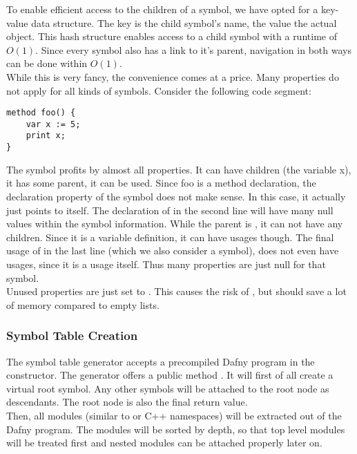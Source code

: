 To enable efficient access to the children of a symbol, we have opted for a key-value data structure.
The key is the child symbol's name, the value the actual  object.
This hash structure enables access to a child symbol with a runtime of $O(1)$.
Since every symbol also has a link to it's parent, navigation in both ways can be done within $O(1)$.\\

While this is very fancy, the convenience comes at a price.
Many properties do not apply for all kinds of symbols.
Consider the following code segment:

\begin{lstlisting}[language=dafny, caption={Example Code Regarding Symbol Information}, captionpos=b, label={lst:aldbkajds}]
method foo() {
    var x := 5;
    print x;
}
\end{lstlisting}

The symbol  profits by almost all properties.
It can have children (the variable x), it has some parent, it can be used.
Since foo is a method declaration, the declaration property of the symbol does not make sense.
In this case, it actually just points to itself.
The declaration of  in the second line will have many null values within the symbol information.
While the parent is , it can not have any children.
Since it is a variable definition, it can have usages though.
The final usage of  in the last line (which we also consider a symbol), does not even have usages, since it is a usage itself.
Thus many properties are just null for that symbol.\\

Unused properties are just set to .
This causes the risk of , but should save a lot of memory compared to empty lists.\\

\subsubsection{Symbol Table Creation}
The symbol table generator accepts a precompiled Dafny program in the constructor.
The generator offers a public method .
It will first of all create a virtual root symbol.
Any other symbols will be attached to the root node as descendants.
The root node is also the final return value.\\

Then, all modules (similar to \CsharpWithSpace or C++ namespaces) will be extracted out of the Dafny program.
The modules will be sorted by depth, so that top level modules will be treated first and nested modules can be attached properly later on.\\

